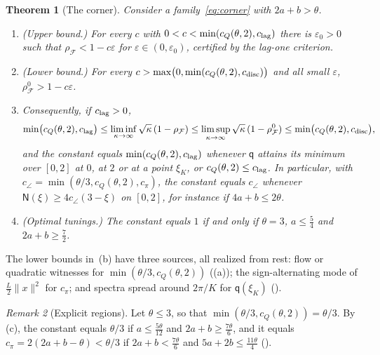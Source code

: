 \documentclass[11pt]{article}
\newtheorem{theorem}{Theorem}[section]
\theoremstyle{definition}
\theoremstyle{remark}
\newtheorem{remark}[theorem]{Remark}
\newcommand{\cF}{\mathcal F}
\newcommand{\norm}[1]{\lVert #1\rVert}
\newcommand{\rhoF}{\rho_{\cF}}
\newcommand{\rhoz}{\rho_{\cF}^{0}}
\newcommand{\cQ}{c_{Q}}
\newcommand{\clag}{c_{\rm lag}}\newcommand{\clayer}{c_{\rm layer}}\newcommand{\cdisc}{c_{\rm disc}}
\newcommand{\cpi}{c_{\pi}}
\newcommand{\ccorner}{c_{\angle}}
\begin{document}
\begin{theorem}[The corner]\label{thm:corner}
Consider a family~\eqref{eq:corner} with \(2a+b>\theta\).
\begin{enumerate}[label=\textup{(\alph*)}]
\item \textup{(Upper bound.)}  For every \(c\) with \(0<c<\min(\cQ(\theta,2),\clag)\) there is \(\varepsilon_0>0\)
such that \(\rhoF<1-c\varepsilon\) for \(\varepsilon\in(0,\varepsilon_0)\), certified by the lag-one
criterion.
\item \textup{(Lower bound.)}  For every \(c>\max\bigl(0,\min(\cQ(\theta,2),\cdisc)\bigr)\) and all small \(\varepsilon\),
\(\rhoz>1-c\varepsilon\).
\item Consequently, if \(\clag>0\),
\[
\min\bigl(\cQ(\theta,2),\clag\bigr)\le\liminf_{\kappa\to\infty}\sqrt\kappa\,(1-\rhoF)\le
\limsup_{\kappa\to\infty}\sqrt\kappa\,(1-\rhoz)\le\min\bigl(\cQ(\theta,2),\cdisc\bigr),
\]
and the constant equals \(\min(\cQ(\theta,2),\clag)\) whenever \(\mathsf q\) attains its minimum over \([0,2]\) at \(0\),
at \(2\) or at a point \(\xi_K\), or \(\cQ(\theta,2)\le\clag\).  In particular, with
\(\ccorner=\min(\theta/3,\cQ(\theta,2),\cpi)\), the constant equals \(\ccorner\) whenever \(\mathsf N(\xi)\ge4\ccorner(3-\xi)\) on \([0,2]\),
for instance if \(4a+b\le2\theta\).
\item \textup{(Optimal tunings.)}  The constant equals \(1\) if and only if \(\theta=3\), \(a\le\frac54\) and
\(2a+b\ge\frac72\).
\end{enumerate}
\end{theorem}

The lower bounds in~(b) have three sources, all realized from rest:
flow or quadratic witnesses for \(\min(\theta/3,\cQ(\theta,2))\) ((a));
the sign-alternating mode of \(\frac L2\norm x^2\) for \(\cpi\);
and spectra spread around \(2\pi/K\) for \(\mathsf q(\xi_K)\) ().

\begin{remark}[Explicit regions]\label{rem:regions}
Let \(\theta\le3\), so that \(\min(\theta/3,\cQ(\theta,2))=\theta/3\).  By (c), the constant
equals \(\theta/3\) if \(a\le\frac{5\theta}{12}\) and \(2a+b\ge\frac{7\theta}6\), and it equals \(\cpi=2(2a+b-\theta)<\theta/3\) if
\(2a+b<\frac{7\theta}6\) and \(5a+2b\le\frac{11\theta}4\) ().
\end{remark}
\end{document}
